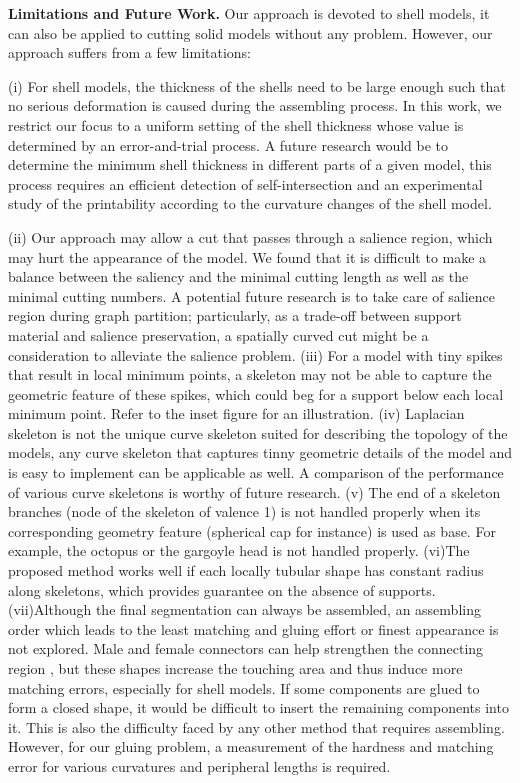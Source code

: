 \textbf{Limitations and Future Work.} Our approach is devoted to shell models, it can also be applied to cutting solid models without any problem. However, our approach suffers from a few limitations:

(i) For shell models, the thickness of the shells need to be large enough such that no serious deformation is caused during the assembling process. In this work, we restrict our focus to a uniform setting of the shell thickness whose value is determined by an error-and-trial process. A future research would be to determine the minimum shell thickness in different parts of a given model, this process requires an efficient detection of self-intersection and an experimental study of the printability according to the curvature changes of the shell model.

(ii) Our approach may allow a cut that passes through a salience region, which may hurt the appearance of the model. We found that it is difficult to make a balance between the saliency and the minimal cutting length as well as the minimal cutting numbers. A potential future research is to take care of salience region during graph partition; particularly, as a trade-off between support material and salience preservation, a spatially curved cut might be a consideration to alleviate the salience problem.
(iii)  {{For a model with tiny spikes that result in local minimum points, a skeleton may not be able to capture the geometric feature of these spikes, which could beg for a support below each local minimum point. Refer to the inset figure for an illustration. }}
(iv) {\color{blue}Laplacian skeleton is not the unique curve skeleton suited for describing the topology of the models, any curve skeleton that captures tinny geometric details of the model and is easy to implement can be applicable as well. A comparison of the performance of various curve skeletons is worthy of future research.
(v) The end of a skeleton branches (node of the skeleton of valence 1) is not handled properly when its corresponding geometry feature (spherical cap for instance) is used as base. For example, the octopus or the gargoyle head is not handled properly.
(vi)The proposed method works well if each locally tubular shape has constant radius along skeletons, which provides guarantee on the absence of supports.
(vii)Although the final segmentation can always be assembled, an assembling order which leads to the least matching and gluing effort or finest appearance is not explored. Male and female connectors can help strengthen the connecting region \cite{LuoBRM12}, but these shapes increase the touching area and thus induce more matching errors, especially for shell models. If some components are glued to form a closed shape, it would be difficult to insert the remaining components into it. This is also the difficulty faced by any other method that requires assembling. However, for our gluing problem, a measurement of the hardness and matching error for various curvatures and peripheral lengths is required. }



